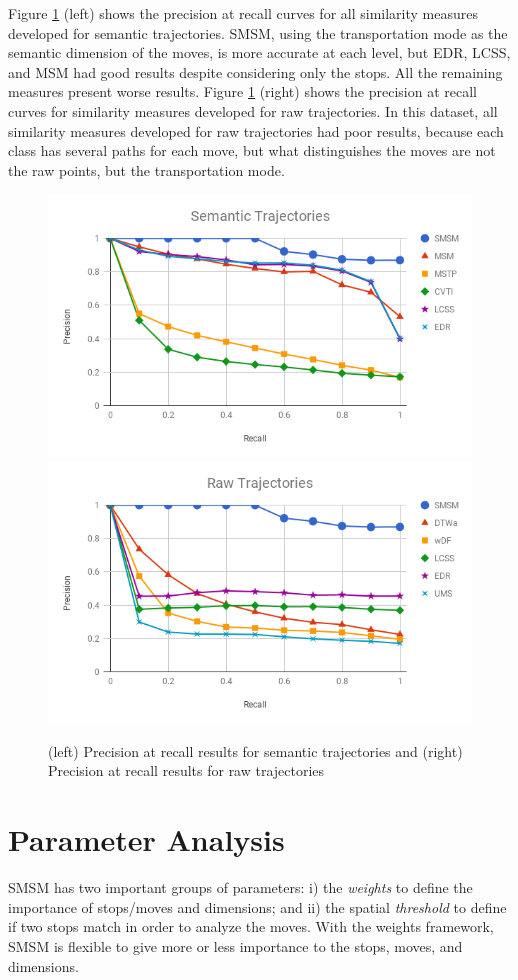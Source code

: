 {Figure {\ref{fig:hermoupolis_precision_recall}} (left) shows the precision at recall curves for all similarity measures developed for semantic trajectories. SMSM, using the transportation mode as the semantic dimension of the moves, is more accurate at each level, but EDR, LCSS, and MSM had   good results despite considering only the stops. All the remaining measures present worse results. Figure {\ref{fig:hermoupolis_precision_recall}} (right) shows the precision at recall curves for similarity measures developed for raw trajectories.  In this dataset, all similarity measures developed for raw trajectories had poor results, because each class has several paths for each move, but what distinguishes the moves are not the raw points, but the transportation mode.}

\begin{figure}[ht!]
\centerline{
\centering
\includegraphics[width=.45\textwidth]{Images/P_R-chart_Hermoupolis_semantic.png}
\includegraphics[width=.45\textwidth]{Images/P_R-chart_Hermoupolis_raw.png}
}
\caption{(left) Precision at recall results for semantic trajectories  and (right) Precision at recall results for raw  trajectories}
\label{fig:hermoupolis_precision_recall}
\end{figure}


\section{Parameter Analysis}\label{sec:sensitivity}

{SMSM has two important groups of parameters: i) the \emph{weights} to define the importance of stops/moves and dimensions; and ii) the spatial \emph{threshold} to define if two stops match in order to analyze the moves.
With the weights framework, SMSM is flexible to give more or less importance to the stops, moves, and dimensions. 
}

